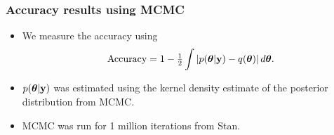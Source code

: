 \documentclass{beamer}
\begin{document}
		
	\begin{frame}
		\frametitle{Accuracy results using MCMC}
		\begin{itemize}
			\item	We measure the accuracy using
			      $$\text{Accuracy} = 1 - \tfrac{1}{2} \int \left |p({\boldsymbol \theta}|{\bf y}) - q({\boldsymbol \theta}) \right | d {\boldsymbol \theta}.$$
			\item	$p({\boldsymbol \theta}|{\bf y})$ was estimated using the kernel density estimate of the posterior
			      distribution from MCMC.
			\item MCMC was run for 1 million iterations from Stan.
		\end{itemize}
	\end{frame}
	
\end{document}
